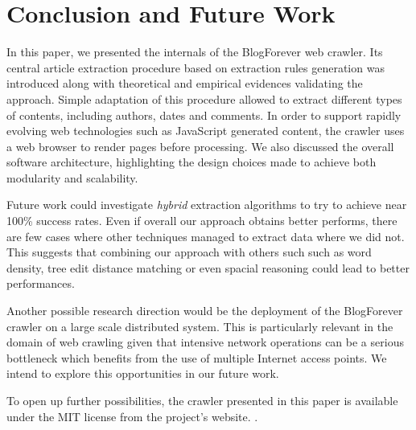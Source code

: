 \section{Conclusion and Future Work}
In this paper, we presented the internals of the BlogForever web crawler. Its central article extraction procedure based on extraction rules generation was introduced along with theoretical and empirical evidences validating the approach. Simple adaptation of this procedure allowed to extract different types of contents, including authors, dates and comments. In order to support rapidly evolving web technologies such as JavaScript generated content, the crawler uses a web browser to render pages before processing. We also discussed the overall software architecture, highlighting the design choices made to achieve both modularity and scalability.

Future work could investigate \emph{hybrid} extraction algorithms to try to achieve near 100\% success rates. Even if overall our approach obtains better performs, there are few cases where other techniques managed to extract data where we did not. This suggests that combining our approach with others such such as word density, tree edit distance matching or even spacial reasoning could lead to better performances.

Another possible research direction would be the deployment of the BlogForever crawler on a large scale distributed system. This is particularly relevant in the domain of web crawling given that intensive network operations can be a serious bottleneck which benefits from the use of multiple Internet access points. We intend to explore this opportunities in our future work.


To open up further possibilities, the crawler presented in this paper is available under the MIT license from the project's website. .

